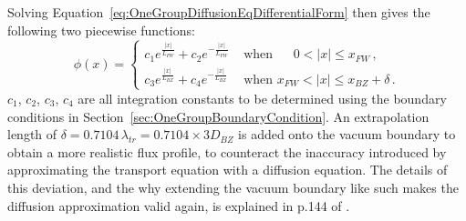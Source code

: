 \documentclass[a4paper, 12pt]{article}
\begin{document}
Solving Equation~\ref{eq:OneGroupDiffusionEqDifferentialForm} then gives the following two piecewise functions:
\begin{equation}\label{eq:OneGroupSwitchCase}
\phi(x) =
\begin{cases}
    c_1 e^{\frac{|x|}{L_{FW}}} + c_2 e^{-\frac{|x|}{L_{FW}}} & \text{ when }\quad\;     0<|x|\le x_{FW}\,,\\
    c_3 e^{\frac{|x|}{L_{BZ}}} + c_4 e^{-\frac{|x|}{L_{BZ}}} & \text{ when }x_{FW}<|x|\le x_{BZ} + \delta \,.
\end{cases}
\end{equation}
$c_1$, $c_2$, $c_3$, $c_4$ are all integration constants to be determined using the boundary conditions in Section~\ref{sec:OneGroupBoundaryCondition}.
An extrapolation length of $\delta = 0.7104\,\lambda_{tr} = 0.7104\times{3D_{BZ}}$ is added onto the vacuum boundary to obtain a more realistic flux profile, to counteract the inaccuracy introduced by approximating the transport equation with a diffusion equation.
The details of this deviation, and the why extending the vacuum boundary like such makes the diffusion approximation valid again, is explained in p.144 of \cite{Duderstadt}.
\end{document}
